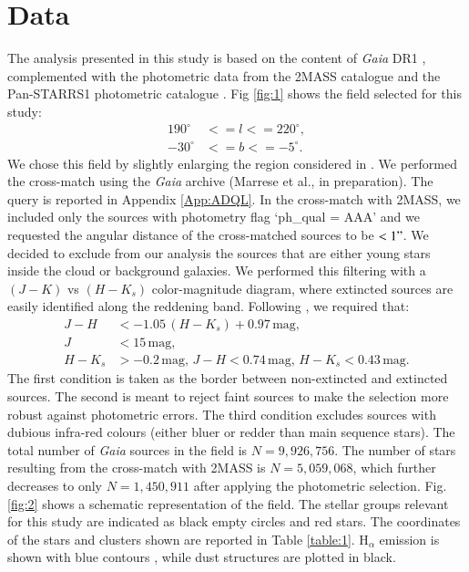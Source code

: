 \documentclass[onecolumn]{aa} %
\begin{document}
\section{Data}
The analysis presented in this study is based on the content of \textit{Gaia} DR1 \citep{Brown2016, vanLeeuwen2017}, complemented with the photometric data from the 2MASS catalogue \citep{Skrutskie2006} and the Pan-STARRS1 photometric catalogue \citep{Chambers2016}. 
Fig \ref{fig:1} shows the field selected for this study:
\begin{align}\label{eq:1}
190^{\circ} & <=  l <= 220^{\circ}, \nonumber \\ 
-30^{\circ}  & <= b <= -5^{\circ}.
\end{align}
We chose this field by slightly enlarging the region considered in \cite{deZeeuw1999}. 
We performed the cross-match using the \textit{Gaia} archive  (Marrese et al., in preparation). The query is reported in Appendix \ref{App:ADQL}.
In the cross-match with 2MASS, we included only the sources with photometry flag  `ph\_qual = AAA'  and we requested the angular distance of the cross-matched sources to be $< 1"$. We decided to exclude from our analysis the sources that are either young stars inside the cloud or background galaxies. We performed this filtering with a $(J-K)$ vs $(H-K_s)$ color-magnitude diagram, where extincted sources are easily identified along the reddening band. Following \cite{Alves2012},  we required that: 
\begin{align}\label{eq:cuts}
J - H & < - 1.05\,(H - K_s) + 0.97  \, \mathrm{mag}, \nonumber \\
J & < 15 \, \mathrm{mag}, \nonumber \\
H - K_s & > -0.2  \, \mathrm{mag},\, 
J - H < 0.74 \, \mathrm{mag},\,
H - K_s < 0.43 \, \mathrm{mag}.   
\end{align}
The first condition is taken as the border between non-extincted and extincted sources.
The second is meant to reject faint sources to make the selection more robust against photometric errors. The third condition excludes sources with dubious infra-red colours (either bluer or redder than main sequence stars).
The total number of \textit{Gaia} sources in the field is $N = 9,926,756$.
The number of stars resulting from the cross-match with 2MASS is $N = 5,059,068$, which further decreases to only $N = 1,450,911
$ after applying the photometric selection.
Fig. \ref{fig:2} shows a schematic representation of the field. The stellar groups relevant for this study are indicated as black empty circles and red stars. The coordinates of the stars and clusters shown are reported in Table \ref{table:1}. H$_{\alpha}$ emission \citep{Finkbeiner2003} is shown with blue contours , while dust structures \citep{Planck2014} are plotted in black. 
\end{document}
